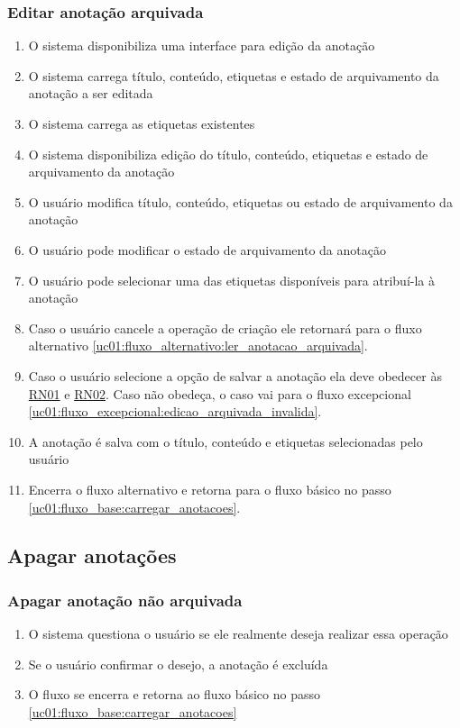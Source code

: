 \documentclass[
	12pt,				%
	oneside,			%
	a4paper,			%
	english,			%
	brazil,				%
	]{abntex2}
\begin{document}
\subsubsection{Editar anotação arquivada} \label{uc01:fluxo_alternativo:editar_anotacao_arquivada}
\begin{enumerate}
    \item O sistema disponibiliza uma interface para edição da anotação
    \item O sistema carrega título, conteúdo, etiquetas e estado de arquivamento da anotação a ser editada
    \item O sistema carrega as etiquetas existentes
    \item O sistema disponibiliza edição do título, conteúdo, etiquetas e estado de arquivamento da anotação
    \item O usuário modifica título, conteúdo, etiquetas ou estado de arquivamento da anotação \label{uc01:fluxo_alternativo:editar_anotacao_arquivada:pode_escrever}
    \item O usuário pode modificar o estado de arquivamento da anotação
    \item O usuário pode selecionar uma das etiquetas disponíveis para atribuí-la à anotação
    \item Caso o usuário cancele a operação de criação ele retornará para o fluxo alternativo \ref{uc01:fluxo_alternativo:ler_anotacao_arquivada}.
    \item Caso o usuário selecione a opção de salvar a anotação ela deve obedecer às \hyperref[uc01:rn01_validacao_anotacao]{RN01} e \hyperref[uc01:rn02_flag_arquivar]{RN02}. Caso não obedeça, o caso vai para o fluxo excepcional \ref{uc01:fluxo_excepcional:edicao_arquivada_invalida}.
    \item A anotação é salva com o título, conteúdo e etiquetas selecionadas pelo usuário
    \item Encerra o fluxo alternativo e retorna para o fluxo básico no passo \ref{uc01:fluxo_base:carregar_anotacoes}.
\end{enumerate}

\subsection{Apagar anotações}
\subsubsection{Apagar anotação não arquivada} \label{uc01:fluxo_alternativo:apagar_anotacao_nao_arquivada}
\begin{enumerate}
    \item O sistema questiona o usuário se ele realmente deseja realizar essa operação
    \item Se o usuário confirmar o desejo, a anotação é excluída
    \item O fluxo se encerra e retorna ao fluxo básico no passo \ref{uc01:fluxo_base:carregar_anotacoes}
\end{enumerate}
\end{document}
